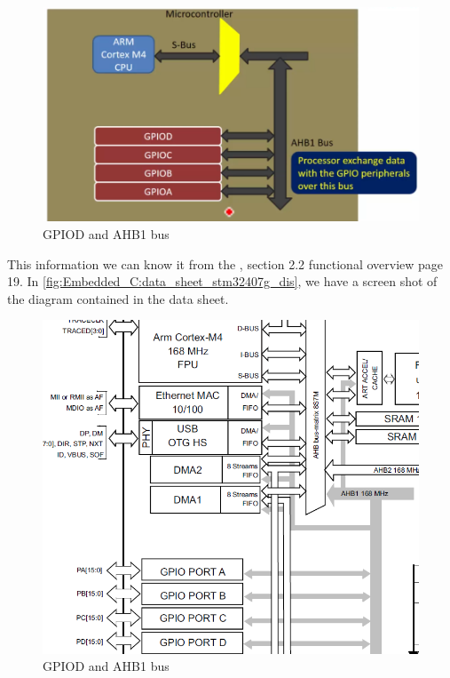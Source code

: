 \begin{figure}[h]
\centering
\includegraphics[scale=0.7]{Figures/Embedded_C/gpio_d_ahb1_bus}
\caption{GPIOD and AHB1 bus}
\label{fig:Embedded_C:gpio_d_ahb1_bus}
\end{figure}

This information we can know it from the , section 2.2 functional overview page 19. In \autoref{fig:Embedded_C:data_sheet_stm32407g_dis}, we have a screen shot of the diagram contained in the data sheet.

\begin{figure}[h]
\centering
\includegraphics[scale=0.7]{Figures/Embedded_C/data_sheet_stm32407g_dis}
\caption{GPIOD and AHB1 bus}
\label{fig:Embedded_C:data_sheet_stm32407g_dis}
\end{figure}

